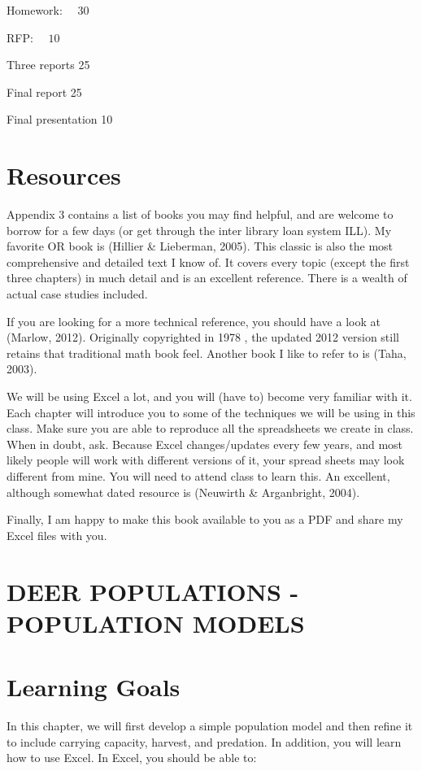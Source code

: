 \documentclass[10pt]{article}
\begin{document}
Homework: $\quad 30$

RFP: $\quad 10$

Three reports 25

Final report 25

Final presentation 10

\section{Resources}
Appendix 3 contains a list of books you may find helpful, and are welcome to borrow for a few days (or get through the inter library loan system ILL). My favorite OR book is (Hillier \& Lieberman, 2005). This classic is also the most comprehensive and detailed text I know of. It covers every topic (except the first three chapters) in much detail and is an excellent reference. There is a wealth of actual case studies included.

If you are looking for a more technical reference, you should have a look at (Marlow, 2012). Originally copyrighted in 1978 , the updated 2012 version still retains that traditional math book feel. Another book I like to refer to is (Taha, 2003).

We will be using Excel a lot, and you will (have to) become very familiar with it. Each chapter will introduce you to some of the techniques we will be using in this class. Make sure you are able to reproduce all the spreadsheets we create in class. When in doubt, ask. Because Excel changes/updates every few years, and most likely people will work with different versions of it, your spread sheets may look different from mine. You will need to attend class to learn this. An excellent, although somewhat dated resource is (Neuwirth \& Arganbright, 2004).

Finally, I am happy to make this book available to you as a PDF and share my Excel files with you.

\section{DEER POPULATIONS - POPULATION MODELS}
\section{Learning Goals}
In this chapter, we will first develop a simple population model and then refine it to include carrying capacity, harvest, and predation. In addition, you will learn how to use Excel. In Excel, you should be able to:
\end{document}
